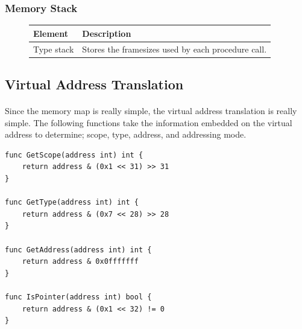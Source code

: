 \subsubsection{Memory Stack}

\begin{figure}[h]
    \centering
    \begin{tabular}{p{1in}p{3in}}
        \toprule
        \textbf{Element} & \textbf{Description}\\
        \midrule Type stack &
        Stores the framesizes used by each procedure call.\\
        
        \bottomrule
    \end{tabular}
\end{figure}

\newpage

\subsection{Virtual Address Translation}

\paragraph{} Since the memory map is really simple, the virtual address
translation is really simple. The following functions take the information
embedded on the virtual address to determine; scope, type, address, and
addressing mode.

\begin{verbatim}
func GetScope(address int) int {
    return address & (0x1 << 31) >> 31
}

func GetType(address int) int {
    return address & (0x7 << 28) >> 28
}

func GetAddress(address int) int {
    return address & 0x0fffffff
}

func IsPointer(address int) bool {
    return address & (0x1 << 32) != 0
}

\end{verbatim}

